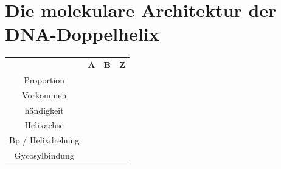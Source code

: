 \section{Die molekulare Architektur der DNA-Doppelhelix}\label{sec:die-molekulare-architektur-der-dna-doppelhelix}

\begin{table}[H]
    \centering
    \begin{tabular}{cccc}
        & \textbf{A}& \textbf{B} & \textbf{Z} \\
        Proportion \\
        Vorkommen \\
        \gls{händigkeit} \\
        Helixachse \\
        Bp / Helixdrehung \\
        Gycosylbindung \\
    \end{tabular}\label{tab:table} %
\end{table}




